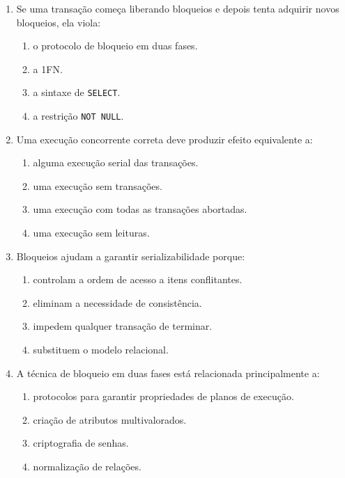 \documentclass[12pt,a4paper]{article}
\begin{document}
\begin{enumerate}[label=\textbf{Q\arabic*.}]
\begin{enumerate}[label=\alph*)]
    \item converter o bloqueio compartilhado para exclusivo.
    \item converter o bloqueio exclusivo para compartilhado.
    \item executar \texttt{DROP TABLE}.
    \item remover a transação.
\end{enumerate}

\item Se uma transação começa liberando bloqueios e depois tenta adquirir novos bloqueios, ela viola:

\begin{enumerate}[label=\alph*)]
    \item o protocolo de bloqueio em duas fases.
    \item a 1FN.
    \item a sintaxe de \texttt{SELECT}.
    \item a restrição \texttt{NOT NULL}.
\end{enumerate}

\item Uma execução concorrente correta deve produzir efeito equivalente a:

\begin{enumerate}[label=\alph*)]
    \item alguma execução serial das transações.
    \item uma execução sem transações.
    \item uma execução com todas as transações abortadas.
    \item uma execução sem leituras.
\end{enumerate}

\item Bloqueios ajudam a garantir serializabilidade porque:

\begin{enumerate}[label=\alph*)]
    \item controlam a ordem de acesso a itens conflitantes.
    \item eliminam a necessidade de consistência.
    \item impedem qualquer transação de terminar.
    \item substituem o modelo relacional.
\end{enumerate}

\item A técnica de bloqueio em duas fases está relacionada principalmente a:

\begin{enumerate}[label=\alph*)]
    \item protocolos para garantir propriedades de planos de execução.
    \item criação de atributos multivalorados.
    \item criptografia de senhas.
    \item normalização de relações.
\end{enumerate}

\end{enumerate}
\end{document}
